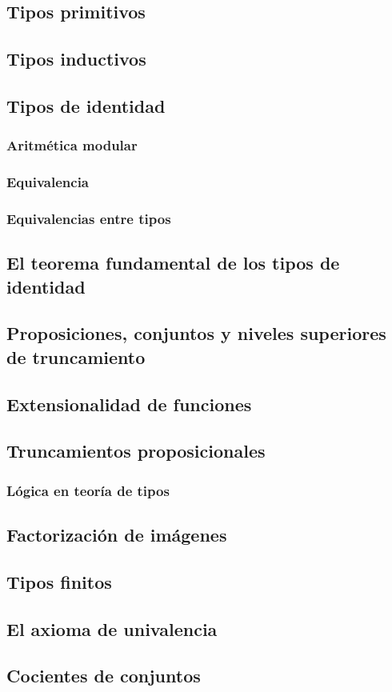 \documentclass{article}
\begin{document}
\subsection{Tipos primitivos}

\subsection{Tipos inductivos}

\subsection{Tipos de identidad}

\subsubsection{Aritmética modular}

\subsubsection{Equivalencia}
    \subsubsection{Equivalencias entre tipos}
\subsection{El teorema fundamental de los tipos de identidad}
\subsection{Proposiciones, conjuntos y niveles superiores de truncamiento}
\subsection{Extensionalidad de funciones}
\subsection{Truncamientos proposicionales}
\subsubsection{Lógica en teoría de tipos}
\subsection{Factorización de imágenes}
\subsection{Tipos finitos}
\subsection{El axioma de univalencia}
\subsection{Cocientes de conjuntos}



\end{document}
